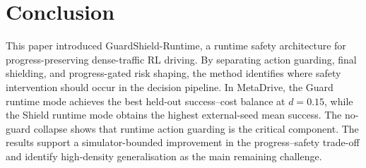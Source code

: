 \documentclass[conference,a4paper]{IEEEtran}
\newcommand{\method}{GuardShield-Runtime}
\begin{document}
\section{Conclusion}
This paper introduced \method{}, a runtime safety architecture for progress-preserving dense-traffic RL driving. By separating action guarding, final shielding, and progress-gated risk shaping, the method identifies where safety intervention should occur in the decision pipeline. In MetaDrive, the Guard runtime mode achieves the best held-out success--cost balance at $d=0.15$, while the Shield runtime mode obtains the highest external-seed mean success. The no-guard collapse shows that runtime action guarding is the critical component. The results support a simulator-bounded improvement in the progress--safety trade-off and identify high-density generalisation as the main remaining challenge.
\FloatBarrier
\balance


\end{document}
